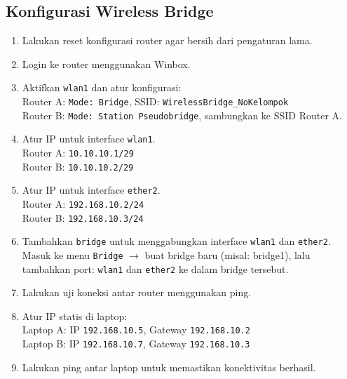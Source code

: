 \subsection{Konfigurasi Wireless Bridge}
\begin{enumerate}
    \item Lakukan reset konfigurasi router agar bersih dari pengaturan lama.

    \item Login ke router menggunakan Winbox.

    \item Aktifkan \texttt{wlan1} dan atur konfigurasi: \\
    Router A: \texttt{Mode: Bridge}, SSID: \texttt{WirelessBridge\_NoKelompok} \\
    Router B: \texttt{Mode: Station Pseudobridge}, sambungkan ke SSID Router A.

    \item Atur IP untuk interface \texttt{wlan1}. \\
    Router A: \texttt{10.10.10.1/29} \\
    Router B: \texttt{10.10.10.2/29}

    \item Atur IP untuk interface \texttt{ether2}. \\
    Router A: \texttt{192.168.10.2/24} \\
    Router B: \texttt{192.168.10.3/24}

    \item Tambahkan \texttt{bridge} untuk menggabungkan interface \texttt{wlan1} dan \texttt{ether2}. \\
    Masuk ke menu \texttt{Bridge} $\rightarrow$ buat bridge baru (misal: bridge1), lalu tambahkan port: \texttt{wlan1} dan \texttt{ether2} ke dalam bridge tersebut.

    \item Lakukan uji koneksi antar router menggunakan ping.

    \item Atur IP statis di laptop: \\
    Laptop A: IP \texttt{192.168.10.5}, Gateway \texttt{192.168.10.2} \\
    Laptop B: IP \texttt{192.168.10.7}, Gateway \texttt{192.168.10.3}

    \item Lakukan ping antar laptop untuk memastikan konektivitas berhasil.
\end{enumerate}

